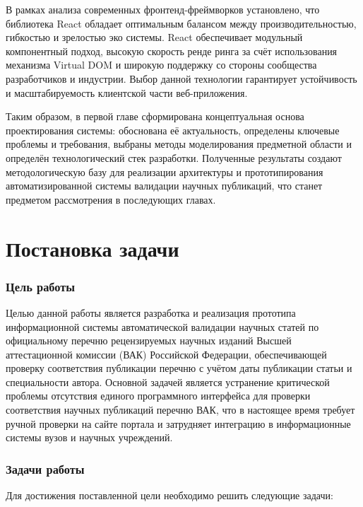 В рамках анализа современных фронтенд-фреймворков установлено, что библиотека React
обладает оптимальным балансом между производительностью, гибкостью и зрелостью эко
системы. React обеспечивает модульный компонентный подход, высокую скорость ренде
ринга за счёт использования механизма Virtual DOM и широкую поддержку со стороны 
сообщества разработчиков и индустрии. Выбор данной технологии гарантирует устойчивость
и масштабируемость клиентской части веб-приложения.

Таким образом, в первой главе сформирована концептуальная основа проектирования
системы: обоснована её актуальность, определены ключевые проблемы и требования, выбраны 
методы моделирования предметной области и определён технологический стек разработки.
Полученные результаты создают методологическую базу для реализации 
архитектуры и прототипирования автоматизированной системы валидации научных публикаций,
что станет предметом рассмотрения в последующих главах.

\section{Постановка задачи}

\subsubsection{Цель работы}

Целью данной работы является разработка и реализация прототипа информационной системы
автоматической валидации научных статей по официальному перечню рецензируемых
научных изданий Высшей аттестационной комиссии (ВАК) Российской Федерации,
обеспечивающей проверку соответствия публикации перечню с учётом даты публикации
статьи и специальности автора.
Основной задачей является устранение критической проблемы отсутствия единого программного
интерфейса для проверки соответствия научных публикаций перечню ВАК, что
в настоящее время требует ручной проверки на сайте портала и затрудняет интеграцию в
информационные системы вузов и научных учреждений.

\subsubsection{Задачи работы}

Для достижения поставленной цели необходимо решить следующие задачи:

